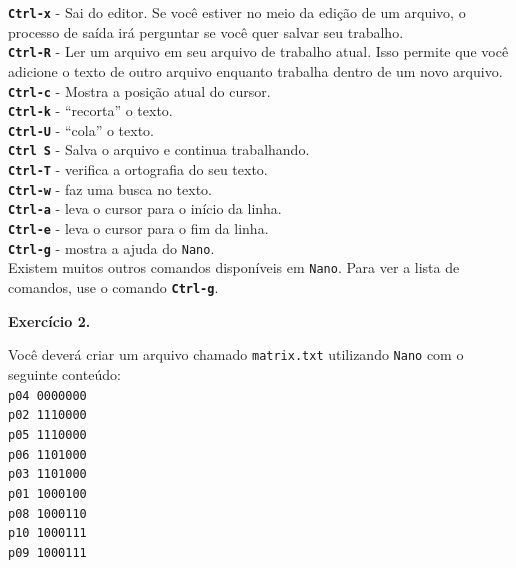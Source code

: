 \begin{refsection}
\noindent\textbf{\texttt{Ctrl-x}} - Sai do editor. Se você estiver no meio da edição de um arquivo, o processo de saída irá perguntar se você quer salvar seu trabalho.\\
\textbf{\texttt{Ctrl-R}} - Ler um arquivo em seu arquivo de trabalho atual. Isso permite que você adicione o texto de outro arquivo enquanto trabalha dentro de um novo arquivo.\\
\textbf{\texttt{Ctrl-c}} - Mostra a posição atual do cursor.\\
\textbf{\texttt{Ctrl-k}} - ``recorta'' o texto.\\
\textbf{\texttt{Ctrl-U}} - ``cola'' o texto.\\
\textbf{\texttt{Ctrl S}} - Salva o arquivo e continua trabalhando.\\
\textbf{\texttt{Ctrl-T}} - verifica a ortografia do seu texto.\\
\textbf{\texttt{Ctrl-w}} - faz uma busca no texto.\\
\textbf{\texttt{Ctrl-a}} - leva o cursor para o início da linha.\\
\textbf{\texttt{Ctrl-e}} - leva o cursor para o fim da linha.\\
\textbf{\texttt{Ctrl-g}} - mostra a ajuda do \texttt{Nano}.\\

Existem muitos outros comandos disponíveis em \texttt{Nano}. Para ver a lista de comandos, use o comando \textbf{\texttt{Ctrl-g}}.\\

\begin{blackBlock}{\textbf{Exercício 2.}}\label{tut2:ex:2.\arabic{ex}}

Você deverá criar um arquivo chamado \texttt{matrix.txt} utilizando \texttt{Nano} com o seguinte conteúdo:\\

\texttt{p04 0000000}\\
\texttt{p02 1110000}\\
\texttt{p05 1110000}\\
\texttt{p06 1101000}\\
\texttt{p03 1101000}\\
\texttt{p01 1000100}\\
\texttt{p08 1000110}\\
\texttt{p10 1000111}\\
\texttt{p09 1000111}\\

\end{blackBlock}


\end{refsection}
